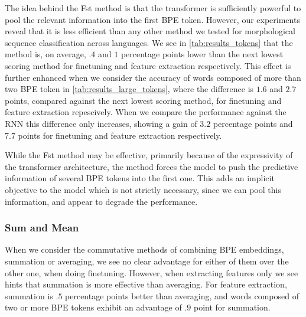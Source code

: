\documentclass[11pt]{article}
\begin{document}
            The idea behind the Fst method is that the transformer is
     sufficiently powerful to pool the relevant information into the
     first BPE token.
                            However, our experiments reveal that it is
     less efficient than any other method we tested for morphological
     sequence classification across languages. We see in
     \cref{tab:results_tokens} that the method is, on average, $.4$
     and $1$ percentage points lower than the next lowest scoring
     method for finetuning and feature extraction respectively.
             This effect is further enhanced when we consider the
     accuracy of words composed of more than two BPE token in
     \cref{tab:results_large_tokens}, where the difference is $1.6$
     and $2.7$ points, compared against the next lowest scoring
     method, for finetuning and feature extraction repescively. When
     we compare the performance against the RNN this difference only
     increases, showing a gain of $3.2$ percentage points and $7.7$
     points for finetuning and feature extraction respectively.

                         While the Fst method may be effective,
     primarily because of the expressivity of the transformer
     architecture, the method forces the model to push the predictive
     information of several BPE tokens into the first one. This adds
     an implicit objective to the model which is not strictly
     necessary, since we can pool this information, and appear to
     degrade the performance.

    \subsubsection{Sum and Mean}
                When we consider the commutative methods of combining
     BPE embeddings, summation or averaging, we see no clear advantage
     for either of them over the other one, when doing
     finetuning. However, when extracting features only we see hints
     that summation is more effective than averaging. For feature
     extraction, summation is $.5$ percentage points better than
     averaging, and words composed of two or more BPE tokens exhibit
     an advantage of $.9$ point for summation.
    
\end{document}
